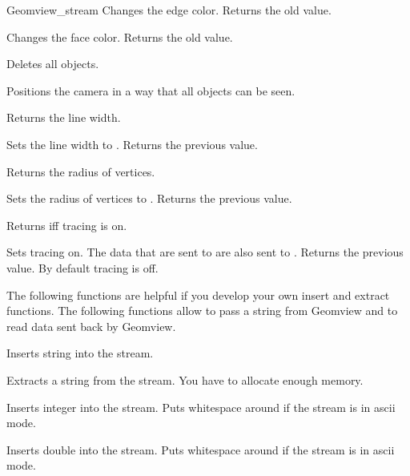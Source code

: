 \begin{ccClass}{Geomview_stream}
{Changes the edge color. Returns the old value.}


{Changes the face color. Returns the old value.}



{Deletes all objects.}

{Positions the camera in a way that all objects can be seen.}

{Returns the line width.}

{Sets the line width to . Returns the previous value.}

{Returns the radius of vertices.}

{Sets the radius of vertices to . Returns the previous value.}

{Returns  iff tracing is on.}

{Sets tracing on. The data that are sent to  are also
 sent to .  Returns the previous value. By default tracing is
 off.}



\newpage
\begin{ccAdvanced}


The following functions are helpful if you develop your own insert
and extract functions. The following functions allow to pass a string
from Geomview and to read data sent back by Geomview.

{Inserts string  into the stream.}


{Extracts a string  from the stream.
\ccPrecond You have to allocate enough memory.}

{Inserts integer  into the stream. Puts whitespace around if the
stream is in ascii mode.}


{Inserts double  into the stream. Puts whitespace around if the
stream is in ascii mode.}


\end{ccAdvanced}
\end{ccClass}
